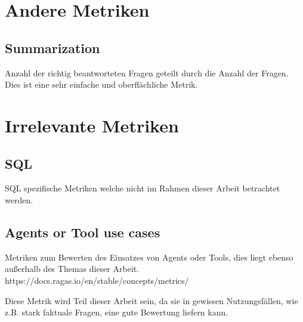 \section{Andere Metriken}
\subsection{Summarization}
Anzahl der richtig beantworteten Fragen geteilt durch die Anzahl der Fragen. Dies ist eine sehr einfache und oberflächliche Metrik.


\section{Irrelevante Metriken}
\subsection{SQL}
SQL spezifische Metriken welche nicht im Rahmen dieser Arbeit betrachtet werden.

\subsection{Agents or Tool use cases}
Metriken zum Bewerten des Einsatzes von Agents oder Tools, dies liegt ebenso außerhalb des Themas dieser Arbeit.
https://docs.ragas.io/en/stable/concepts/metrics/

Diese Metrik wird Teil dieser Arbeit sein, da sie in gewissen Nutzungsfällen, wie z.B. stark faktuale Fragen, eine gute Bewertung liefern kann.